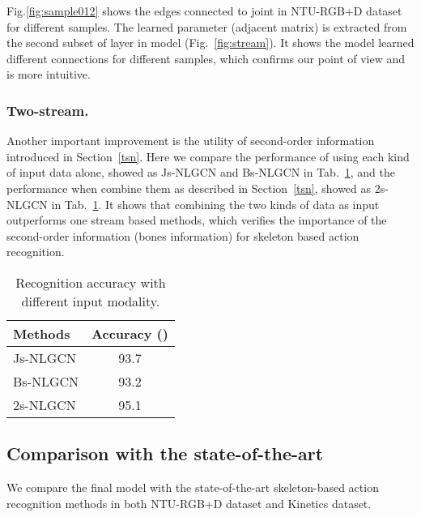 \documentclass[10pt,twocolumn,letterpaper]{article}
\begin{document}
    Fig.\ref{fig:sample012} shows the edges connected to  joint in NTU-RGB+D dataset for different samples. The learned parameter (adjacent matrix) is extracted from the second subset of  layer in model (Fig.~\ref{fig:stream}). It shows the model learned different connections for different samples, which  confirms our point of view and is more intuitive.
    
    
    \subsubsection{Two-stream.}
    Another important improvement is the utility of second-order information introduced in Section~\ref{tsn}. Here we compare the performance of using each kind of input data alone, showed as Js-NLGCN and Bs-NLGCN in Tab.~\ref{tab:twostream}, and the performance when combine them as described in Section~\ref{tsn}, showed as 2s-NLGCN in Tab.~\ref{tab:twostream}.
It shows that combining the two kinds of data as input outperforms one stream based methods, which verifies the importance of the second-order information (bones information) for skeleton based action recognition.


    \begin{table}[htb]
		\label{tab:twostream}
		\begin{center}
		\begin{tabular}{lc}
			\hline
			Methods     & Accuracy ()    \\
			\hline
			Js-NLGCN & 93.7       \\
			Bs-NLGCN & 93.2       \\
            2s-NLGCN & 95.1        \\
			\hline
		\end{tabular}
		\end{center}
        \caption{Recognition accuracy with different input modality.}
	\end{table}
   
    
    \subsection{Comparison with the state-of-the-art}
    
    We compare the final model with the state-of-the-art skeleton-based action recognition methods in both NTU-RGB+D dataset and Kinetics dataset. 
\end{document}
